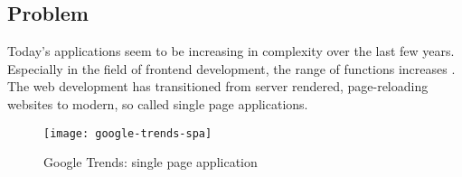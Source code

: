 \subsection{Problem}
\label{subsec:problem}

Today's applications seem to be increasing in complexity over the last few years. 
Especially in the field of frontend development, the range of functions increases \cite{kevin2018}.
The web development has transitioned from server rendered, page-reloading websites to modern, so called single page applications.
\begin{figure}[h]
\texttt{[image: google-trends-spa]}
\centering
\caption{Google Trends: single page application}
\label{fig:google-trends-spa}
\end{figure}